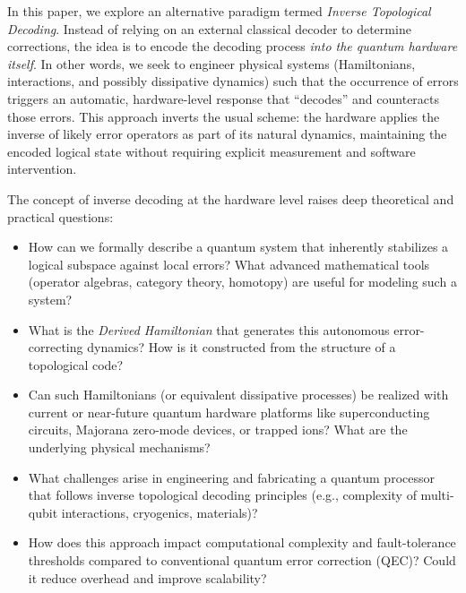 \documentclass[11pt]{article}
\begin{document}
In this paper, we explore an alternative paradigm termed \emph{Inverse Topological Decoding}. Instead of relying on an external classical decoder to determine corrections, the idea is to encode the decoding process \emph{into the quantum hardware itself}. In other words, we seek to engineer physical systems (Hamiltonians, interactions, and possibly dissipative dynamics) such that the occurrence of errors triggers an automatic, hardware-level response that ``decodes'' and counteracts those errors. This approach inverts the usual scheme: the hardware applies the inverse of likely error operators as part of its natural dynamics, maintaining the encoded logical state without requiring explicit measurement and software intervention.

The concept of inverse decoding at the hardware level raises deep theoretical and practical questions:
\begin{itemize}
    \item How can we formally describe a quantum system that inherently stabilizes a logical subspace against local errors? What advanced mathematical tools (operator algebras, category theory, homotopy) are useful for modeling such a system?
    \item What is the \textit{Derived Hamiltonian} that generates this autonomous error-correcting dynamics? How is it constructed from the structure of a topological code?
    \item Can such Hamiltonians (or equivalent dissipative processes) be realized with current or near-future quantum hardware platforms like superconducting circuits, Majorana zero-mode devices, or trapped ions? What are the underlying physical mechanisms?
    \item What challenges arise in engineering and fabricating a quantum processor that follows inverse topological decoding principles (e.g., complexity of multi-qubit interactions, cryogenics, materials)? 
    \item How does this approach impact computational complexity and fault-tolerance thresholds compared to conventional quantum error correction (QEC)? Could it reduce overhead and improve scalability?
\end{itemize}
\end{document}

